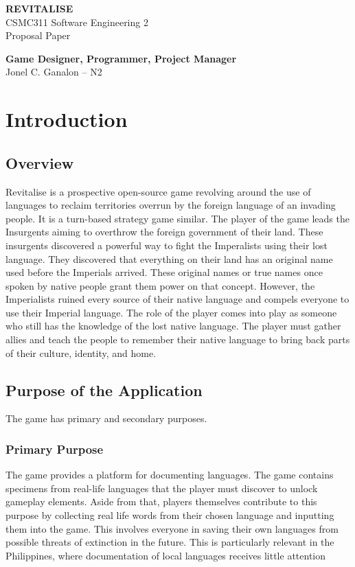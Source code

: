 \documentclass[11pt]{article}
\begin{document}
\begin{titlepage}
  \thispagestyle{fancy}

  \vspace*{4cm}
  \centering
    \vfill
    {\LARGE \textbf{REVITALISE}} \\
    \vspace{0.5cm}
    CSMC311 Software Engineering 2 \\
    Proposal Paper
    
    \vfill

    \textbf{Game Designer, Programmer, Project Manager} \\
    Jonel C. Ganalon -- N2

    \vspace{1cm}
    
    \vfill 
\end{titlepage}

\section{Introduction}
\subsection{Overview}
Revitalise is a prospective open-source game revolving around the use of languages to reclaim territories overrun by the foreign language of an invading people. It is a turn-based strategy game similar. The player of the game leads the Insurgents aiming to overthrow the foreign government of their land. These insurgents discovered a powerful way to fight the Imperalists using their lost language. They discovered that everything on their land has an original name used before the Imperials arrived. These original names or true names once spoken by native people grant them power on that concept. However, the Imperialists ruined every source of their native language and compels everyone to use their Imperial language. The role of the player comes into play as someone who still has the knowledge of the lost native language. The player must gather allies and teach the people to remember their native language to bring back parts of their culture, identity, and home.


\subsection{Purpose of the Application}
The game has primary and secondary purposes.
\subsubsection{Primary Purpose}
The game provides a platform for documenting languages. The game contains specimens from real-life languages that the player must discover to unlock gameplay elements. Aside from that, players themselves contribute to this purpose by collecting real life words from their chosen language and inputting them into the game. This involves everyone in saving their own languages from possible threats of extinction in the future. This is particularly relevant in the Philippines, where documentation of local languages receives little attention
\end{document}
